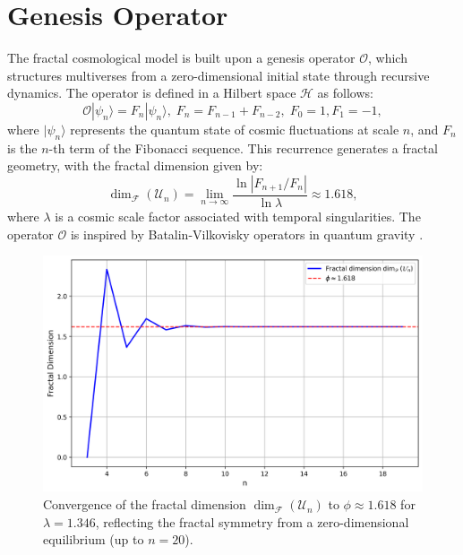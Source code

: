 \documentclass[aps,prl,twocolumn,groupedaddress]{revtex4-2}
\begin{document}
\section{Genesis Operator}
The fractal cosmological model is built upon a genesis operator \(\mathcal{O}\), which structures multiverses from a zero-dimensional initial state through recursive dynamics. The operator is defined in a Hilbert space \(\mathcal{H}\) as follows:
\begin{equation}
\mathcal{O} |\psi_n\rangle = F_n |\psi_n\rangle, \; F_n = F_{n-1} + F_{n-2}, \; F_0 = 1, F_1 = -1,
\end{equation}
where \(|\psi_n\rangle\) represents the quantum state of cosmic fluctuations at scale \(n\), and \(F_n\) is the \(n\)-th term of the Fibonacci sequence. This recurrence generates a fractal geometry, with the fractal dimension given by:
\begin{equation}
\dim_{\mathscr{F}}(\mathcal{U}_n) = \lim_{n \to \infty} \frac{\ln |F_{n+1}/F_n|}{\ln \lambda} \approx 1.618,
\end{equation}
where \(\lambda\) is a cosmic scale factor associated with temporal singularities. The operator \(\mathcal{O}\) is inspired by Batalin-Vilkovisky operators in quantum gravity \cite{Nottale1993}.

\begin{figure}[h!]
    \centering
    \includegraphics[width=\columnwidth]{figures/fractal_dimension.png}
    \caption{Convergence of the fractal dimension \(\dim_{\mathscr{F}}(\mathcal{U}_n)\) to \(\phi \approx 1.618\) for \(\lambda = 1.346\), reflecting the fractal symmetry from a zero-dimensional equilibrium (up to \( n = 20 \)).}
    \label{fig:fractal_dimension}
\end{figure}
\end{document}
